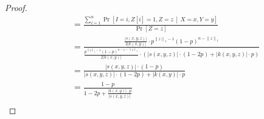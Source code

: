 \documentclass[10pt]{article}
\newcommand{\norm}[1]{\left\| #1 \right\|}
\begin{document}
\begin{proof}
\begin{align*}
& \quad = \frac{\displaystyle \sum_{i=1}^n \Pr \left[ I = i, Z[i] = 1, Z = z \, \middle| \, X = x, Y = y \right]}{\displaystyle \Pr \left[ Z = z \right]} \\
& \quad = \frac{\displaystyle \frac{|s(x,y,z)|}{2|k(x,y)|} \cdot p^{\norm{z}_1 - 1} (1 - p)^{n - \norm{z}_1}}{\displaystyle \frac{p^{\norm{z}_1 - 1} (1 - p)^{n - 1 - \norm{z}_1}}{2|k(x,y)|} \cdot \left( |s(x,y,z)| \cdot (1 - 2p) + |k(x,y,z)| \cdot p \right) } \\
& \quad = \frac{\displaystyle |s(x,y,z)| \cdot (1 - p)}{\displaystyle |s(x,y,z)| \cdot (1 - 2p) + |k(x,y)| \cdot p } \\
& \quad = \frac{\displaystyle 1 - p}{\displaystyle 1 - 2p + \frac{|k(x,y)| \cdot p}{|s(x,y,z)|}} \\
\end{align*}


\end{proof}
\end{document}

